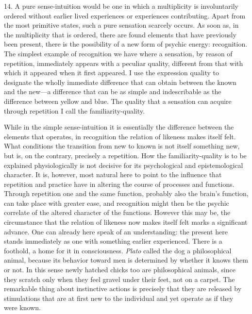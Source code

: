 \documentclass[12pt,a4paper]{book}
\newcommand{\opage}[1]{\marginnote{\footnotesize\textit{[#1]}}}
\begin{document}
14. A pure sense-intuition would be one in \opage{47}which a multiplicity is
involuntarily ordered without earlier lived experiences or experiences
contributing. Apart from the most primitive states, such a pure sensation
scarcely occurs. As soon as, in the multiplicity that is ordered, there
are found elements that have previously been present, there is the
possibility of a new form of psychic energy: recognition. The simplest
example of recognition we have where a sensation, by reason of
repetition, immediately appears with a peculiar quality, different from
that with which it appeared when it first appeared. I use the expression
quality to designate the wholly immediate difference that can obtain
between the known and the new---a difference that can be as simple and
indescribable as the difference between yellow and blue. The quality that
a sensation can acquire through repetition I call the familiarity-quality.

While in the simple sense-intuition it is essentially the difference
between the elements that operates, in recognition the relation of
likeness makes itself felt. What conditions the transition from new to
known is not itself something new, but is, on the contrary, precisely a
repetition. How the familiarity-quality is to be explained physiologically
is not decisive for its psychological and epistemological character. It
is, however, most natural here to point to the influence that repetition
and practice have in altering the course of processes and functions.
Through repetition one and the same function, probably also the brain's
function, can take place with greater ease, and recognition might then be
the psychic correlate of the altered character of the functions. However
this may be, the circumstance that the relation of likeness now makes
itself felt marks a significant advance. One can already here speak of an
understanding: the present here stands immediately as one with something
earlier experienced. There is a foothold, a home for it in \opage{48}consciousness.
\emph{Plato} called the dog a philosophical animal, because its behavior
toward men is determined by whether it knows them or not. In this sense
newly hatched chicks too are philosophical animals, since they scratch
only when they feel gravel under their feet, not on a carpet. The
remarkable thing about instinctive actions is precisely that they are
released by stimulations that are at first new to the individual and yet
operate as if they were known.
\end{document}
